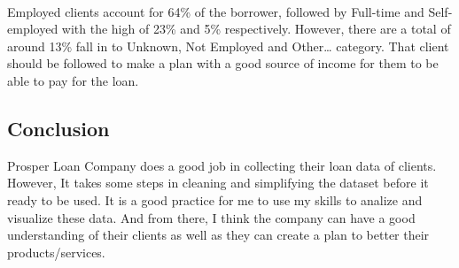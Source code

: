 \documentclass[11pt]{article}
\begin{document}
    \begin{center}
    \end{center}
    { \hspace*{\fill} \\}
    
    Employed clients account for 64\% of the borrower, followed by Full-time
and Self-employed with the high of 23\% and 5\% respectively. However,
there are a total of around 13\% fall in to Unknown, Not Employed and
Other\ldots{} category. That client should be followed to make a plan
with a good source of income for them to be able to pay for the loan.

    \hypertarget{conclusion}{%
\subsection{Conclusion}\label{conclusion}}

    Prosper Loan Company does a good job in collecting their loan data of
clients. However, It takes some steps in cleaning and simplifying the
dataset before it ready to be used. It is a good practice for me to use
my skills to analize and visualize these data. And from there, I think
the company can have a good understanding of their clients as well as
they can create a plan to better their products/services.


    
    
    
    
\end{document}
